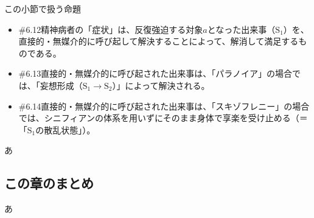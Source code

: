\begin{note}{この小節で扱う命題}
\begin{itemize}
    \item{\#6.12}精神病者の「症状」は、反復強迫する対象$a$となった出来事（$\textrm{S}_1$）を、直接的・無媒介的に呼び起して解決することによって、解消して満足するものである。
    \item{\#6.13}直接的・無媒介的に呼び起された出来事は、「パラノイア」の場合では、「妄想形成（$\textrm{S}_1\rightarrow\textrm{S}_2$）」によって解決される。
    \item{\#6.14}直接的・無媒介的に呼び起された出来事は、「スキゾフレニー」の場合では、シニフィアンの体系を用いずにそのまま身体で享楽を受け止める（＝「$\textrm{S}_1$の散乱状態」）。
  \end{itemize}
\end{note}

あ

\subsection{この章のまとめ}\label{ux3053ux306eux7ae0ux306eux307eux3068ux3081}

あ
